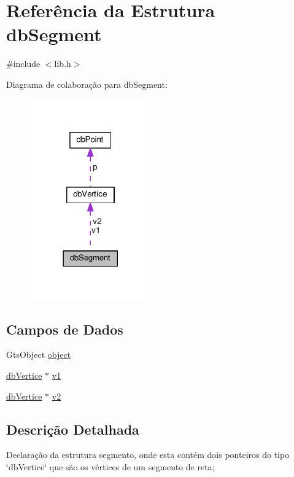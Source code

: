 \hypertarget{structdbSegment}{}\section{Referência da Estrutura db\+Segment}
\label{structdbSegment}


{\ttfamily \#include $<$lib.\+h$>$}



Diagrama de colaboração para db\+Segment\+:\nopagebreak
\begin{figure}[H]
\begin{center}
\leavevmode
\includegraphics[width=146pt]{structdbSegment__coll__graph}
\end{center}
\end{figure}
\subsection*{Campos de Dados}
\begin{DoxyCompactItemize}
\item 
Gts\+Object \hyperlink{structdbSegment_a4c9ad028a3c5d740f1fc0b15669c1c0f}{object}
\item 
\hyperlink{structdbVertice}{db\+Vertice} $\ast$ \hyperlink{structdbSegment_ac54d355714c397af2824dfa3743b0059}{v1}
\item 
\hyperlink{structdbVertice}{db\+Vertice} $\ast$ \hyperlink{structdbSegment_a63dc8509dabff387725bbdc284734f6a}{v2}
\end{DoxyCompactItemize}


\subsection{Descrição Detalhada}
Declaração da estrutura segmento, onde esta contém dois ponteiros do tipo \char`\"{}db\+Vertice\char`\"{} que são os vértices de um segmento de reta; 

